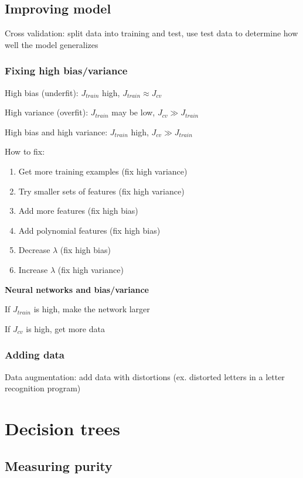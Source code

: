 \documentclass[12pt]{article}
\begin{document}
\subsection{Improving model}

Cross validation: split data into training and test, use test data to determine how well the model generalizes

\subsubsection{Fixing high bias/variance}

High bias (underfit): $J_{train}$ high, $J_{train} \approx J_{cv}$

High variance (overfit): $J_{train}$ may be low, $J_{cv} \gg J_{train}$

High bias and high variance: $J_{train}$ high, $J_{cv} \gg J_{train}$

How to fix:

\begin{enumerate}
\item Get more training examples (fix high variance)
\item Try smaller sets of features (fix high variance)
\item Add more features (fix high bias)
\item Add polynomial features (fix high bias)
\item Decrease $\lambda$ (fix high bias)
\item Increase $\lambda$ (fix high variance)
\end{enumerate}

\textbf{Neural networks and bias/variance}

If $J_{train}$ is high, make the network larger

If $J_{cv}$ is high, get more data

\subsubsection{Adding data}

Data augmentation: add data with distortions (ex. distorted letters in a letter recognition program)

\section{Decision trees}

\subsection{Measuring purity}
\end{document}
